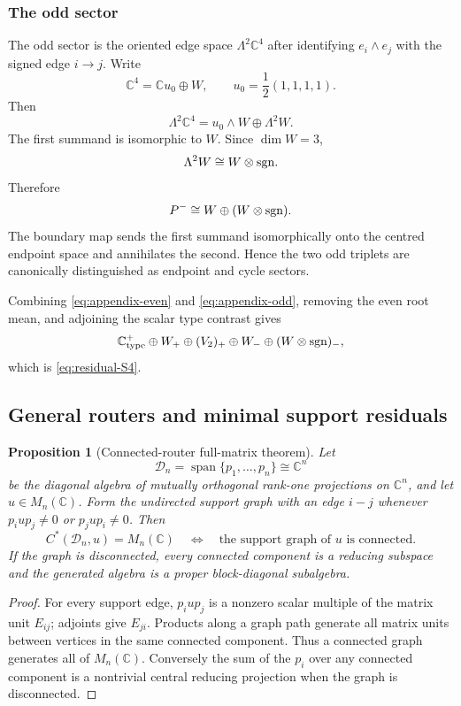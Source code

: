 \documentclass[11pt]{article}
\numberwithin{equation}{section}
\newtheorem{proposition}[theorem]{Proposition}
\theoremstyle{definition}
\theoremstyle{remark}
\newcommand{\C}{\mathbb C}
\newcommand{\Span}{\operatorname{span}}
\begin{document}
\subsubsection{The odd sector}

The odd sector is the oriented edge space
$\Lambda^2\C^4$ after identifying
$e_i\wedge e_j$ with the signed edge $i\to j$.  Write
\[
\C^4=\C u_0\oplus W,
\qquad
u_0=\frac12(1,1,1,1).
\]
Then
\[
\Lambda^2\C^4
=
u_0\wedge W\oplus\Lambda^2W.
\]
The first summand is isomorphic to $W$.  Since $\dim W=3$,
\[
\Lambda^2W\cong W\otimes{\rm sgn}.
\]
Therefore
\begin{equation}
P^-
\cong
W\oplus(W\otimes{\rm sgn}).
\label{eq:appendix-odd}
\end{equation}
The boundary map sends the first summand isomorphically onto the centred
endpoint space and annihilates the second.  Hence the two odd triplets are
canonically distinguished as endpoint and cycle sectors.

Combining \eqref{eq:appendix-even} and \eqref{eq:appendix-odd}, removing the
even root mean, and adjoining the scalar type contrast gives
\[
\C_{\rm type}^{+}
\oplus W_+\oplus(V_2)_+
\oplus W_-\oplus(W\otimes{\rm sgn})_-,
\]
which is \eqref{eq:residual-S4}.


\subsection{General routers and minimal support residuals}

\begin{proposition}[Connected-router full-matrix theorem]
\label{thm:connected-router}
Let
\[
\mathcal D_n=\Span\{p_1,\ldots,p_n\}\cong\C^n
\]
be the diagonal algebra of mutually orthogonal rank-one projections on
$\C^n$, and let $u\in M_n(\C)$.  Form the undirected support graph with an
edge $i-j$ whenever $p_iup_j\ne0$ or $p_jup_i\ne0$.  Then
\begin{equation}
C^*(\mathcal D_n,u)=M_n(\C)
\quad\Longleftrightarrow\quad
\text{the support graph of $u$ is connected}.
\label{eq:router-full-matrix}
\end{equation}
If the graph is disconnected, every connected component is a reducing
subspace and the generated algebra is a proper block-diagonal subalgebra.
\end{proposition}

\begin{proof}
For every support edge, $p_iup_j$ is a nonzero scalar multiple of the matrix
unit $E_{ij}$; adjoints give $E_{ji}$.  Products along a graph path generate
all matrix units between vertices in the same connected component.  Thus a
connected graph generates all of $M_n(\C)$.  Conversely the sum of the
$p_i$ over any connected component is a nontrivial central reducing
projection when the graph is disconnected.
\end{proof}
\end{document}

